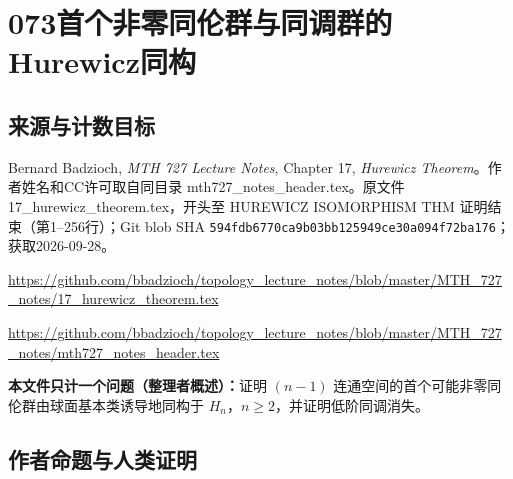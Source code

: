\documentclass[UTF8,11pt]{ctexart}
\theoremstyle{definition}
\begin{document}
\section*{073\quad 首个非零同伦群与同调群的Hurewicz同构}
\subsection*{来源与计数目标}
Bernard Badzioch, \emph{MTH 727 Lecture Notes}, Chapter 17, \emph{Hurewicz Theorem}。作者姓名和CC许可取自同目录 mth727\_notes\_header.tex。原文件17\_hurewicz\_theorem.tex，开头至 HUREWICZ ISOMORPHISM THM 证明结束（第1--256行）；Git blob SHA \texttt{594fdb6770ca9b03bb125949ce30a094f72ba176}；获取2026-09-28。
\par\url{https://github.com/bbadzioch/topology_lecture_notes/blob/master/MTH_727_notes/17_hurewicz_theorem.tex}
\par\url{https://github.com/bbadzioch/topology_lecture_notes/blob/master/MTH_727_notes/mth727_notes_header.tex}
\par\textbf{本文件只计一个问题（整理者概述）：}证明 $(n-1)$ 连通空间的首个可能非零同伦群由球面基本类诱导地同构于 $H_n$，$n\geq2$，并证明低阶同调消失。
\subsection*{作者命题与人类证明}
\end{document}
